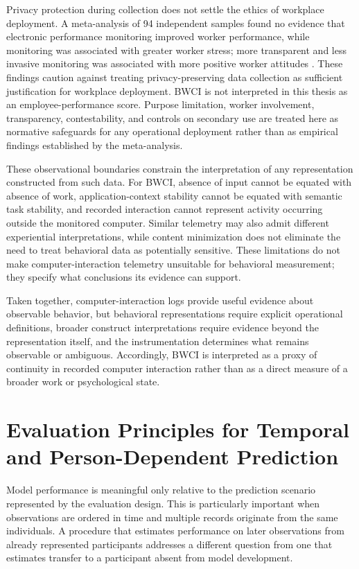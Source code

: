 Privacy protection during collection does not settle the ethics of workplace deployment. A meta-analysis of 94 independent samples found no evidence that electronic performance monitoring improved worker performance, while monitoring was associated with greater worker stress; more transparent and less invasive monitoring was associated with more positive worker attitudes \parencite{ravid2023monitoring}. These findings caution against treating privacy-preserving data collection as sufficient justification for workplace deployment. BWCI is not interpreted in this thesis as an employee-performance score. Purpose limitation, worker involvement, transparency, contestability, and controls on secondary use are treated here as normative safeguards for any operational deployment rather than as empirical findings established by the meta-analysis.

These observational boundaries constrain the interpretation of any representation constructed from such data. For BWCI, absence of input cannot be equated with absence of work, application-context stability cannot be equated with semantic task stability, and recorded interaction cannot represent activity occurring outside the monitored computer. Similar telemetry may also admit different experiential interpretations, while content minimization does not eliminate the need to treat behavioral data as potentially sensitive. These limitations do not make computer-interaction telemetry unsuitable for behavioral measurement; they specify what conclusions its evidence can support.

Taken together, computer-interaction logs provide useful evidence about observable behavior, but behavioral representations require explicit operational definitions, broader construct interpretations require evidence beyond the representation itself, and the instrumentation determines what remains observable or ambiguous. Accordingly, BWCI is interpreted as a proxy of continuity in recorded computer interaction rather than as a direct measure of a broader work or psychological state.

\section{Evaluation Principles for Temporal and Person-Dependent Prediction}

Model performance is meaningful only relative to the prediction scenario represented by the evaluation design. This is particularly important when observations are ordered in time and multiple records originate from the same individuals. A procedure that estimates performance on later observations from already represented participants addresses a different question from one that estimates transfer to a participant absent from model development.

